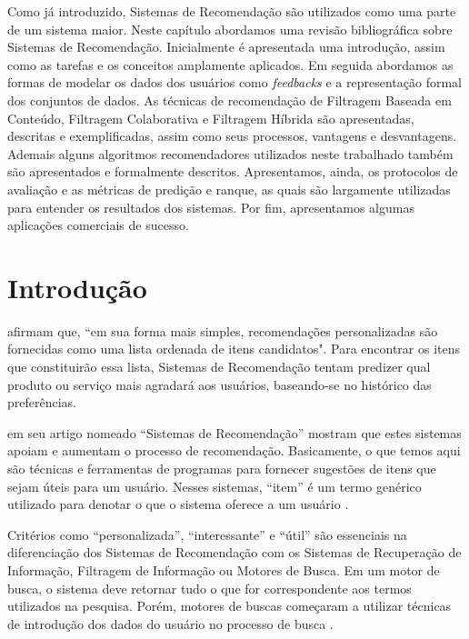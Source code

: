 \label{cap:recommendation_system}
\acresetall 

Como já introduzido, Sistemas de Recomendação são utilizados como uma parte de um sistema maior. Neste capítulo abordamos uma revisão bibliográfica sobre Sistemas de Recomendação. Inicialmente é apresentada uma introdução, assim como as tarefas e os conceitos amplamente aplicados. Em seguida abordamos as formas de modelar os dados dos usuários como \textit{feedbacks} e a representação formal dos conjuntos de dados. As técnicas de recomendação de Filtragem Baseada em Conteúdo, Filtragem Colaborativa e Filtragem Híbrida são apresentadas, descritas e exemplificadas, assim como seus processos, vantagens e desvantagens. Ademais alguns algoritmos recomendadores utilizados neste trabalhado também são apresentados e formalmente descritos. Apresentamos, ainda, os protocolos de avaliação e as métricas de predição e ranque, as quais são largamente utilizadas para entender os resultados dos sistemas. Por fim, apresentamos algumas aplicações comerciais de sucesso.

\section{Introdução}
 afirmam que, ``em sua forma mais simples, recomendações personalizadas são fornecidas como uma lista ordenada de itens candidatos". Para encontrar os itens que constituirão essa lista, Sistemas de Recomendação tentam predizer qual produto ou serviço mais agradará aos usuários, baseando-se no histórico das preferências.

 em seu artigo nomeado ``Sistemas de Recomendação'' mostram que estes sistemas apoiam e aumentam o processo de recomendação. Basicamente, o que temos aqui são técnicas e ferramentas de programas para fornecer sugestões de itens que sejam úteis para um usuário. Nesses sistemas, ``item'' é um termo genérico utilizado para denotar o que o sistema oferece a um usuário \cite{Ricci:2011}.

Critérios como ``personalizada'', ``interessante'' e ``útil'' são essenciais na diferenciação dos Sistemas de Recomendação com os Sistemas de Recuperação de Informação, Filtragem de Informação ou Motores de Busca. Em um motor de busca, o sistema deve retornar tudo o que for correspondente aos termos utilizados na pesquisa. Porém, motores de buscas começaram a utilizar técnicas de introdução dos dados do usuário no processo de busca \cite{Burke:2002}.

